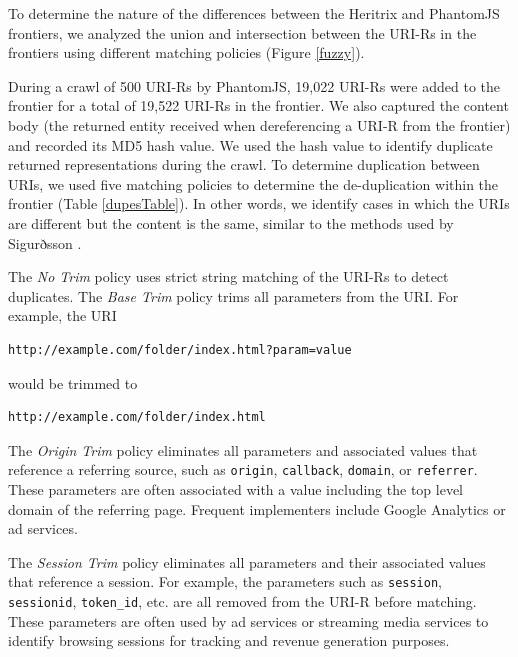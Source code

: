\documentclass{sig-alternate}
\begin{document}
To determine the nature of the differences between the Heritrix and PhantomJS frontiers, we analyzed the union and intersection between the URI-Rs in the frontiers using different matching policies (Figure \ref{fuzzy}). %

During a crawl of 500 URI-Rs by PhantomJS, 19,022 URI-Rs were added to the frontier for a total of 19,522 URI-Rs in the frontier. We also captured the content body (the returned entity received when dereferencing a URI-R from the frontier) and recorded its MD5 hash value. We used the hash value to identify duplicate returned representations during the crawl. To determine duplication between URIs, we used five matching policies to determine the de-duplication within the frontier (Table \ref{dupesTable}). In other words, we identify cases in which the URIs are different but the content is the same, similar to the methods used by Sigurðsson \cite{uriDupes, uriDupes2}.

The \emph{No Trim} policy uses strict string matching of the URI-Rs to detect duplicates. The \emph{Base Trim} policy trims all parameters from the URI. For example, the URI 

\begin{verbatim}
http://example.com/folder/index.html?param=value 
\end{verbatim}
\vskip -3mm

\noindent would be trimmed to 
\vskip -3mm

\begin{verbatim}
http://example.com/folder/index.html
\end{verbatim} 
\vskip -3mm
 
The \emph{Origin Trim} policy eliminates all parameters and associated values that reference a referring source, such as \texttt{origin}, \texttt{callback}, \texttt{domain}, or \texttt{referrer}. These parameters are often associated with a value including the top level domain of the referring page. Frequent implementers include Google Analytics or ad services.

The \emph{Session Trim} policy eliminates all parameters and their associated values that reference a session. 
For example, the parameters such as \texttt{session}, \texttt{sessionid}, \texttt{token\_id}, etc. are all removed from the URI-R before matching. These parameters are often used by ad services or streaming media services to identify browsing sessions for tracking and revenue generation purposes.
\end{document}
